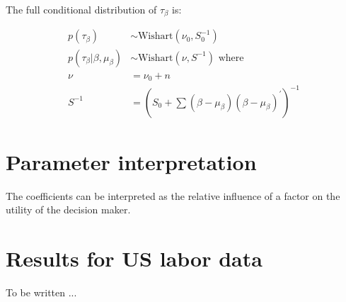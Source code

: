 The full conditional distribution of $\tau_{\beta}$ is:

\begin{align}
  p(\tau_{\beta}) &\sim \text{Wishart}(\nu_0, S_0^{-1}) \\
  p(\tau_{\beta} | \beta, \mu_{\beta}) &\sim \text{Wishart}(\nu, S^{-1}) \text{ where } \\
  \nu &= \nu_0 + n \\
  S^{-1} &= \left(S_0 + \sum (\beta - \mu_{\beta})(\beta - \mu_{\beta})^{\prime}\right)^{-1}
\end{align}

\section{Parameter interpretation}

The coefficients can be interpreted as the relative influence of a factor on the
utility of the decision maker.

\section{Results for US labor data}

To be written ...
